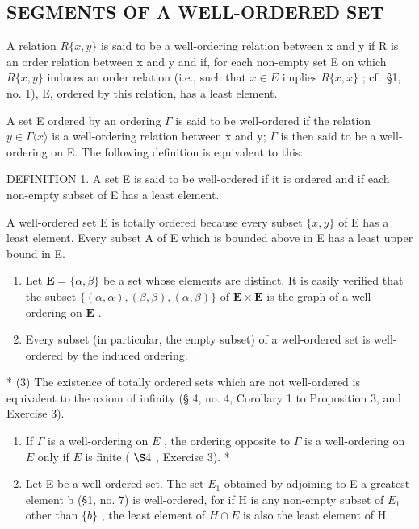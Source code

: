 \subsection{SEGMENTS OF A WELL-ORDERED SET}

A relation \(R\{x, y\}\) is said to be a well-ordering relation between x and y if R is an order relation between x and y and if, for each non-empty set E on which \(R\{x, y\}\) induces an order relation (i.e., such that \(x \in E\) implies \(R\{x, x\}\) ; cf.~§1, no. 1), E, ordered by this relation, has a least element.

A set E ordered by an ordering \(\Gamma\) is said to be well-ordered if the relation \(y \in \Gamma\langle x \rangle\) is a well-ordering relation between x and y; \(\Gamma\) is then said to be a well-ordering on E. The following definition is equivalent to this:

DEFINITION 1. A set E is said to be well-ordered if it is ordered and if each non-empty subset of E has a least element.

A well-ordered set E is totally ordered because every subset \(\{x, y\}\) of E has a least element. Every subset A of E which is bounded above in E has a least upper bound in E.


\begin{enumerate}
\def\labelenumi{(\arabic{enumi})}
\item
  Let \(\mathbf{E} = \{\alpha, \beta\}\) be a set whose elements are distinct. It is easily verified that the subset \(\{(\alpha, \alpha), (\beta, \beta), (\alpha, \beta)\}\) of \(\mathbf{E} \times \mathbf{E}\) is the graph of a well-ordering on \(\mathbf{E}\) .
\item
  Every subset (in particular, the empty subset) of a well-ordered set is well-ordered by the induced ordering.
\end{enumerate}

* (3) The existence of totally ordered sets which are not well-ordered is equivalent to the axiom of infinity (§ 4, no. 4, Corollary 1 to Proposition 3, and Exercise 3).

\begin{enumerate}
\def\labelenumi{(\arabic{enumi})}
\setcounter{enumi}{3}
\item
  If \(\Gamma\) is a well-ordering on \(E\) , the ordering opposite to \(\Gamma\) is a well-ordering on \(E\) only if \(E\) is finite ( \(\S 4\) , Exercise 3). *
\item
  Let E be a well-ordered set. The set \(E_{1}\) obtained by adjoining to E a greatest element b (§1, no. 7) is well-ordered, for if H is any non-empty subset of \(E_{1}\) other than \(\{b\}\) , the least element of \(H \cap E\) is also the least element of H.
\end{enumerate}

